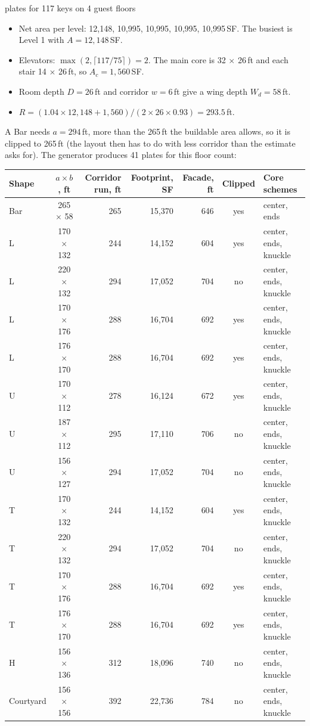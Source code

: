 \documentclass[10pt,a4paper]{article}
\begin{document}
\begin{example}{plates for 117 keys on 4 guest floors}
\begin{itemize}
\item Net area per level: 12,148, 10,995, 10,995, 10,995, 10,995\,SF. The busiest is Level 1 with $A = 12,148$\,SF.
\item Elevators: $\max(2, \lceil 117/75 \rceil) = 2$. The main core is 32 $\times$ 26\,ft and each
stair 14 $\times$ 26\,ft, so $A_c = 1,560$\,SF.
\item Room depth $D = 26$\,ft and corridor $w = 6$\,ft give a wing depth $W_d = 58$\,ft.
\item $R = (1.04 \times 12,148 + 1,560) / (2 \times 26 \times 0.93) = 293.5$\,ft.
\end{itemize}
A Bar needs $a = 294$\,ft, more than the 265\,ft the buildable area allows, so it is clipped to 265\,ft
(the layout then has to do with less corridor than the estimate asks for). The generator produces 41 plates for this floor count:
\begin{center}\centering\small
\begin{tabular}{@{}l c r r r c l@{}}
\toprule
\textbf{Shape} & \textbf{$a \times b$, ft} & \textbf{Corridor run, ft} & \textbf{Footprint, SF} & \textbf{Facade, ft} & \textbf{Clipped} & \textbf{Core schemes} \\ \midrule
Bar & 265 $\times$ 58 & 265 & 15,370 & 646 & yes & center, ends \\
L & 170 $\times$ 132 & 244 & 14,152 & 604 & yes & center, ends, knuckle \\
L & 220 $\times$ 132 & 294 & 17,052 & 704 & no & center, ends, knuckle \\
L & 170 $\times$ 176 & 288 & 16,704 & 692 & yes & center, ends, knuckle \\
L & 176 $\times$ 170 & 288 & 16,704 & 692 & yes & center, ends, knuckle \\
U & 170 $\times$ 112 & 278 & 16,124 & 672 & yes & center, ends, knuckle \\
U & 187 $\times$ 112 & 295 & 17,110 & 706 & no & center, ends, knuckle \\
U & 156 $\times$ 127 & 294 & 17,052 & 704 & no & center, ends, knuckle \\
T & 170 $\times$ 132 & 244 & 14,152 & 604 & yes & center, ends, knuckle \\
T & 220 $\times$ 132 & 294 & 17,052 & 704 & no & center, ends, knuckle \\
T & 170 $\times$ 176 & 288 & 16,704 & 692 & yes & center, ends, knuckle \\
T & 176 $\times$ 170 & 288 & 16,704 & 692 & yes & center, ends, knuckle \\
H & 156 $\times$ 136 & 312 & 18,096 & 740 & no & center, ends, knuckle \\
Courtyard & 156 $\times$ 156 & 392 & 22,736 & 784 & no & center, ends, knuckle \\
\bottomrule
\end{tabular}
\end{center}
\end{example}
\end{document}
